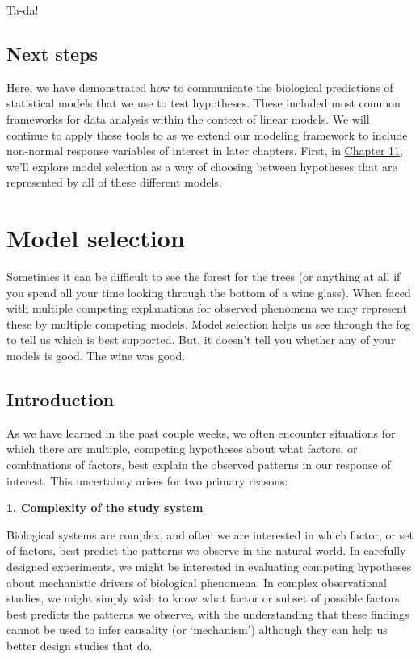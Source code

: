 \documentclass[
]{book}
\begin{document}
Ta-da!

\hypertarget{next10}{%
\section{Next steps}\label{next10}}

Here, we have demonstrated how to communicate the biological predictions of statistical models that we use to test hypotheses. These included most common frameworks for data analysis within the context of linear models. We will continue to apply these tools to as we extend our modeling framework to include non-normal response variables of interest in later chapters. First, in \protect\hyperlink{Chapter11}{Chapter 11}, we'll explore model selection as a way of choosing between hypotheses that are represented by all of these different models.

\hypertarget{Chapter11}{%
\chapter{Model selection}\label{Chapter11}}

Sometimes it can be difficult to see the forest for the trees (or anything at all if you spend all your time looking through the bottom of a wine glass). When faced with multiple competing explanations for observed phenomena we may represent these by multiple competing models. Model selection helps us see through the fog to tell us which is best supported. But, it doesn't tell you whether any of your models is good. The wine was good.

\hypertarget{intro11}{%
\section{Introduction}\label{intro11}}

As we have learned in the past couple weeks, we often encounter situations for which there are multiple, competing hypotheses about what factors, or combinations of factors, best explain the observed patterns in our response of interest. This uncertainty arises for two primary reasons:

\textbf{1. Complexity of the study system}

Biological systems are complex, and often we are interested in which factor, or set of factors, best predict the patterns we observe in the natural world. In carefully designed experiments, we might be interested in evaluating competing hypotheses about mechanistic drivers of biological phenomena. In complex observational studies, we might simply wish to know what factor or subset of possible factors best predicts the patterns we observe, with the understanding that these findings cannot be used to infer causality (or `mechanism') although they can help us better design studies that do.
\end{document}

